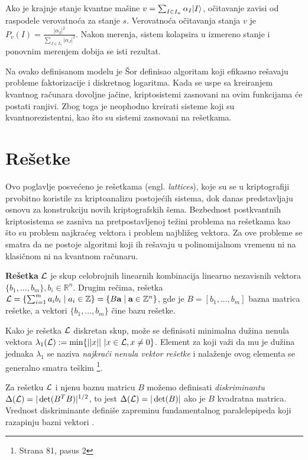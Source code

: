 Ako je krajnje stanje kvantne mašine $v = \sum_{I \in I_n} \alpha_I | I \rangle $, očitavanje zavisi od raspodele verovatnoća za stanje $s$. Verovatnoća očitavanja stanja $v$ je $P_v(I) = \frac{|\alpha_I|^2}{\sum_{J \in I_n} |\alpha_J|^2} $. \cite{postquantumcryptography:2009} Nakon merenja, sistem kolapsira u izmereno stanje i ponovnim merenjem dobija se isti rezultat.

Na ovako definisanom modelu je Šor \cite{Shor_1997} definisao algoritam koji efikasno rešavaju probleme faktorizacije i diskretnog logaritma. Kada se uspe sa kreiranjem kvantnog računara dovoljne jačine, kriptosistemi zasnovani na ovim funkcijama će postati ranjivi. Zbog toga je neophodno  kreirati sisteme koji su kvantnorezistentni, kao što su sistemi zasnovani na rešetkama.

\section{Rešetke}

Ovo poglavlje posvećeno je rešetkama (engl. \textit{lattices}), koje su se u kriptografiji prvobitno koristile za kriptoanalizu postojećih sistema, dok danas predstavljaju osnovu za konstrukciju novih kriptografskih šema. Bezbednost postkvantnih kriptosistema se zasniva na pretpostavljenoj težini problema na rešetkama kao što su problem najkraćeg vektora i problem najbližeg vektora. Za ove probleme se smatra da ne postoje algoritmi koji ih rešavaju u polinomijalnom vremenu ni na klasičnom ni na kvantnom računaru.

\begin{definition}
    \textbf{Rešetka} $\mathcal{L}$ je skup celobrojnih linearnih kombinacija linearno nezavisnih vektora $\{b_1, ..., b_m\}, b_i \in \mathbb{R}^n$. Drugim rečima, rešetka $\mathcal{L} = \{ \sum_{i=1}^m a_ib_i \mid a_i \in \mathbb{Z} \} = \{ B \textbf{a} \mid \textbf{a} \in \mathbb{Z}^n \}$, gde je $B = [b_1, ..., b_m]$ bazna matrica rešetke, a vektori $\{b_1, ..., b_m\}$ čine bazu rešetke.
\end{definition}

Kako je rešetka $\mathcal{L}$ diskretan skup, može se definisati minimalna dužina nenula vektora $\lambda_1(\mathcal{L}) := \min \{||x|| \ | x \in \mathcal{L}, x \neq 0 \} $. Element za koji važi da  mu je dužina jednaka $\lambda_1$ se naziva \textit{najkraći nenula vektor rešetke} i nalaženje ovog elementa se generalno smatra teškim \cite{smart2016cryptography} \footnote{Strana 81, pasus 2}. 

Za rešetku $\mathcal{L}$ i njenu baznu matricu $B$ možemo definisati \textit{diskriminantu} $\Delta(\mathcal{L}) = |\det(B^TB)|^{1/2} $, to jest $\Delta(\mathcal{L}) = |\det(B)|$ ako je $B$ kvadratna matrica. Vrednost diskriminante definiše zapreminu fundamentalnog paralelepipeda koji razapinju bazni vektori \cite{smart2016cryptography}. 

